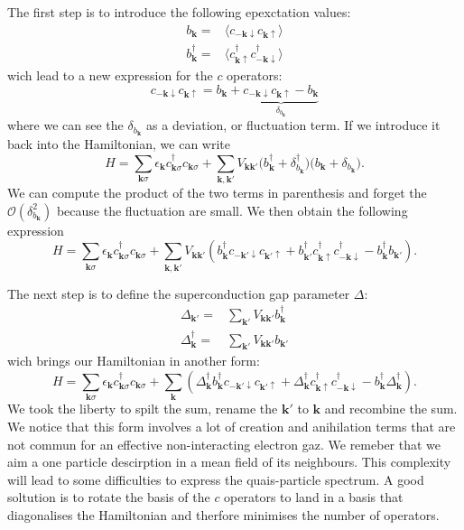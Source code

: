 \documentclass[../main.tex]{subfile}
\begin{document}
The first step is to introduce the following epexctation values:
\begin{align}
    b_{\bm{k}} = &\langle c_{-\bm{k}\downarrow}c_{\bm{k}\uparrow}\rangle \\
    b_{\bm{k}}^{\dagger} = &\langle c_{\bm{k}\uparrow}^{\dagger}c_{-\bm{k}\downarrow}^{\dagger}\rangle 
\end{align}
wich lead to a new expression for the $c$ operators:
\begin{equation}
    c_{-\bm{k}\downarrow}c_{\bm{k}\uparrow} = b_{\bm{k}} + \underbrace{c_{-\bm{k}\downarrow}c_{\bm{k}\uparrow} - b_{\bm{k}}}_{\delta_{b_{\bm{k}}}}
\end{equation}
where we can see the $\delta_{b_{\bm{k}}}$ as a deviation, or fluctuation term. If we introduce it back into the Hamiltonian, we can write
\[
    H = \sum_{\bm{k}\sigma} \epsilon_{\bm{k}} c_{\bm{k}\sigma}^{\dagger}c_{\bm{k}\sigma} + \sum_{\bm{k},\bm{k}'} V_{\bm{k}\bm{k}'} \bigl( b_{\bm{k}}^{\dagger} + \delta_{b_{\bm{k}}}^{\dagger}\bigr)\bigl( b_{\bm{k}} + \delta_{b_{\bm{k}}}\bigr).
\]
We can compute the product of the two terms in parenthesis and forget the $\mathcal{O}\left(\delta_{b_{\bm{k}}}^2\right)$ because the fluctuation are small. We then obtain the following expression
\[
    H = \sum_{\bm{k}\sigma} \epsilon_{\bm{k}} c_{\bm{k}\sigma}^{\dagger}c_{\bm{k}\sigma} + \sum_{\bm{k},\bm{k}'} V_{\bm{k}\bm{k}'} \left( b_{\bm{k}}^{\dagger}c_{-\bm{k}'\downarrow}c_{\bm{k}'\uparrow}  + b_{\bm{k}'}^{\dagger} c_{\bm{k}\uparrow} ^{\dagger}c_{-\bm{k}\downarrow}^{\dagger} -  b_{\bm{k}}^{\dagger} b_{\bm{k}'}\right).
\]

The next step is to define the superconduction gap parameter $\Delta$:
\begin{align}
    \Delta_{\bm{k}'} = &\sum_{\bm{k}'} V_{\bm{k}\bm{k}'} b_{\bm{k}}^{\dagger}\\
    \Delta^{\dagger}_{\bm{k}} = &\sum_{\bm{k}'} V_{\bm{k}\bm{k}'} b_{\bm{k}'}
\end{align}
wich brings our Hamiltonian in another form:
\[
    H = \sum_{\bm{k}\sigma} \epsilon_{\bm{k}} c_{\bm{k}\sigma}^{\dagger}c_{\bm{k}\sigma} + \sum_{\bm{k}} \left( \Delta_{\bm{k}}^{\dagger} b_{\bm{k}}^{\dagger}c_{-\bm{k}'\downarrow}c_{\bm{k}'\uparrow}  + \Delta_{\bm{k}}^{\dagger} c_{\bm{k}\uparrow} ^{\dagger}c_{-\bm{k}\downarrow}^{\dagger} -  b_{\bm{k}}^{\dagger} \Delta_{\bm{k}}^{\dagger} \right).
\]
We took the liberty to spilt the sum, rename the $\bm{k}'$ to $\bm{k}$ and recombine the sum. We notice that this form involves a lot of creation and anihilation terms that 
are not commun for an effective non-interacting electron gaz. We remeber that we aim a one particle descirption in a mean field of its neighbours.
This complexity will lead to some difficulties to express the quais-particle spectrum. A good soltution is 
to rotate the basis of the $c$ operators to land in a basis that diagonalises the Hamiltonian and therfore minimises the number of operators.
\end{document}

